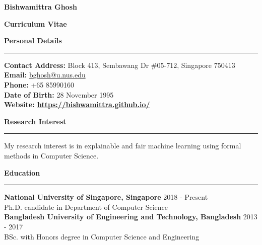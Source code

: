 \documentclass[a4paper,11pt,final]{article}
\newcommand{\Sep}{\vspace{1.5em}}
\newcommand{\SmallSep}{\vspace{0.5em}}
\begin{document}
	
	\begin{center}
		\Huge \textbf{Bishwamittra Ghosh}\\
		\vspace{0.2em}	
		\Large \centerline{ \textbf{Curriculum Vitae}}
	\end{center}
	
	\Sep
	\Large { \textbf{Personal Details}}\\
	\noindent\rule{\textwidth}{1pt}
	\normalsize 
	 \textbf{Contact Address:} Block 413, Sembawang Dr \#05-712, Singapore 750413\\
	\textbf{Email:} \url{bghosh@u.nus.edu}  \\
	\textbf{Phone:} +65 85990160\\
	\textbf{Date of Birth:}  28  November  1995 \\
	\textbf{Website: \url{https://bishwamittra.github.io/}} 

	\Sep	
\Large { \textbf{Research Interest}}\\
\noindent\rule{\textwidth}{1pt}
\normalsize
My research interest is in explainable and fair machine learning using formal methods in Computer Science. 
	
	\Sep	
\Large { \textbf{Education}}\\
\noindent\rule{\textwidth}{1pt}
\normalsize
\textbf{National University of Singapore, Singapore}
\hspace*{\fill} 2018  - Present\\
Ph.D. candidate in Department of Computer Science\\

\SmallSep
\textbf{Bangladesh University of Engineering and Technology, Bangladesh}
\hspace*{\fill} 2013  -  2017\\
BSc. with Honors degree in Computer Science and Engineering\\
\end{document}
